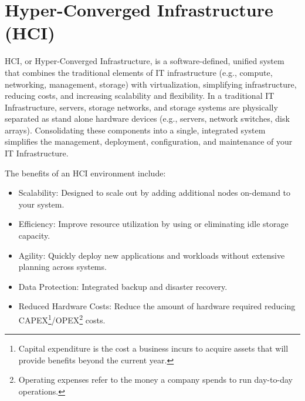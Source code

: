 \section{Hyper-Converged Infrastructure (HCI)} \label{section: HCI}

HCI, or Hyper-Converged Infrastructure, is a software-defined, unified system that combines the traditional elements of IT infrastructure (e.g., compute, networking, management, storage) with virtualization, simplifying infrastructure, reducing costs, and increasing scalability and flexibility. In a traditional IT Infrastructure, servers, storage networks, and storage systems are physically separated as stand alone hardware devices (e.g., servers, network switches, disk arrays). Consolidating these components into a single, integrated system simplifies the management, deployment, configuration, and maintenance of your IT Infrastructure. 

The benefits of an HCI environment include: 
\begin{itemize}
    \item Scalability: Designed to scale out by adding additional nodes on-demand to your system.
    \item Efficiency: Improve resource utilization by using or eliminating idle storage capacity.
    \item Agility: Quickly deploy new applications and workloads without extensive planning across systems. 
    \item Data Protection: Integrated backup and disaster recovery.
    \item Reduced Hardware Costs: Reduce the amount of hardware required reducing CAPEX\footnote{Capital expenditure is the cost a business incurs to acquire assets that will provide benefits beyond the current year.}/OPEX\footnote{Operating expenses refer to the money a company spends to run day-to-day operations.} costs. 
\end{itemize}


